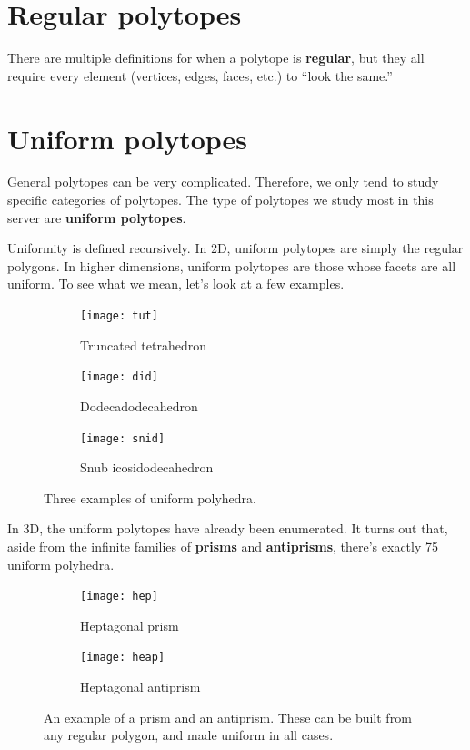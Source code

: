 \documentclass{article}
\begin{document}


\section{Regular polytopes}
There are multiple definitions for when a polytope is \textbf{regular},
but they all require every element (vertices, edges, faces, etc.) to ``look the same.''

\section{Uniform polytopes}
General polytopes can be very complicated. Therefore, we only tend to study specific categories of polytopes. The type of polytopes we study most in this server are \textbf{uniform polytopes}.

Uniformity is defined recursively. In 2D, uniform polytopes are simply the regular polygons.
In higher dimensions, uniform polytopes are those whose facets are all uniform. To see what we mean, let's look at a few examples.

\begin{figure}[H]
  \centering
  \begin{subfigure}{.33333\textwidth}
    \centering
    \texttt{[image: tut]}
    \caption{Truncated tetrahedron}
    \label{fig:tut}
  \end{subfigure}%
  \begin{subfigure}{.33333\textwidth}
    \centering
    \texttt{[image: did]}
    \caption{Dodecadodecahedron}
    \label{fig:did}
  \end{subfigure}%
  \begin{subfigure}{.33333\textwidth}
    \centering
    \texttt{[image: snid]}
    \caption{Snub icosidodecahedron}
    \label{fig:snid}
  \end{subfigure}%
  \caption{Three examples of uniform polyhedra.}
  \label{fig:uniforms3D}
\end{figure}

In 3D, the uniform polytopes have already been enumerated. It turns out that, aside from the infinite families of \textbf{prisms} and \textbf{antiprisms}, there's exactly 75 uniform polyhedra.

\begin{figure}[H]
  \centering
  \begin{subfigure}{.5\textwidth}
    \centering
    \texttt{[image: hep]}
    \caption{Heptagonal prism}
    \label{fig:hep}
  \end{subfigure}%
  \begin{subfigure}{.5\textwidth}
    \centering
    \texttt{[image: heap]}
    \caption{Heptagonal antiprism}
    \label{fig:heap}
  \end{subfigure}%
  \caption{An example of a prism and an antiprism. These can be built from any regular polygon, and made uniform in all cases.}
  \label{fig:prisms}
\end{figure}
\end{document}
